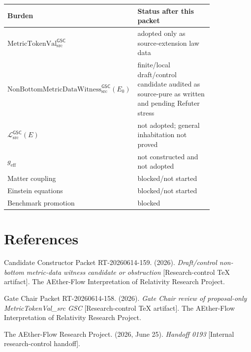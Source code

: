 \documentclass[11pt]{article}
\newcommand{\MetricTokenVal}{\mathrm{MetricTokenVal}_{\mathrm{src}}^{\mathsf{GSC}}}
\newcommand{\Witness}{\mathrm{NonBottomMetricDataWitness}_{\mathrm{src}}^{\mathsf{GSC}}}
\newcommand{\MetricData}{\mathcal{L}_{\mathrm{src}}^{\mathsf{GSC}}}
\newcommand{\geff}{g_{\mathrm{eff}}}
\newcommand{\Ezero}{E_{0}}
\begin{document}
\begin{longtable}{p{0.25\linewidth}p{0.58\linewidth}}
\toprule
Burden & Status after this packet \\
\midrule
\(\MetricTokenVal\) & adopted only as source-extension law data \\
\(\Witness(\Ezero)\) & finite/local draft/control candidate audited as
source-pure as written and pending Refuter stress \\
\(\MetricData(E)\) & not adopted; general inhabitation not proved \\
\(\geff\) & not constructed and not adopted \\
Matter coupling & blocked/not started \\
Einstein equations & blocked/not started \\
Benchmark promotion & blocked \\
\bottomrule
\end{longtable}

\section{References}

Candidate Constructor Packet RT-20260614-159. (2026). \emph{Draft/control
non-bottom metric-data witness candidate or obstruction} [Research-control
TeX artifact]. The AEther-Flow Interpretation of Relativity Research Project.

Gate Chair Packet RT-20260614-158. (2026). \emph{Gate Chair review of
proposal-only MetricTokenVal\_src GSC} [Research-control TeX artifact]. The
AEther-Flow Interpretation of Relativity Research Project.

The AEther-Flow Research Project. (2026, June 25). \emph{Handoff 0193}
[Internal research-control handoff].
\end{document}
